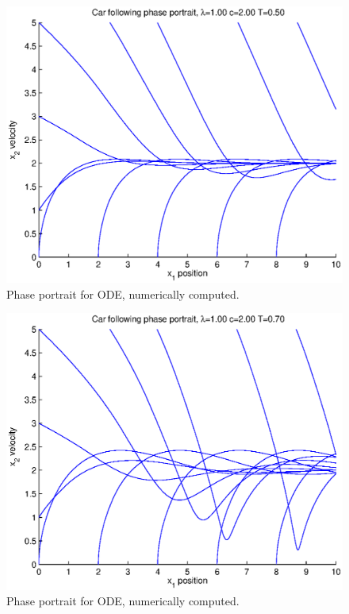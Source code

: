 \documentclass[11pt,a4paper]{article}
\begin{document}
\begin{figure}[ht]
\centering
\includegraphics[width=400pt]{phasedelay1-2-05}
\caption{Phase portrait for ODE, numerically computed.}
\label{phasedelay1-2-05}
\end{figure}

\begin{figure}[ht]
\centering
\includegraphics[width=400pt]{phasedelay1-2-07}
\caption{Phase portrait for ODE, numerically computed.}
\label{phasedelay1-2-07}
\end{figure}
\end{document}

